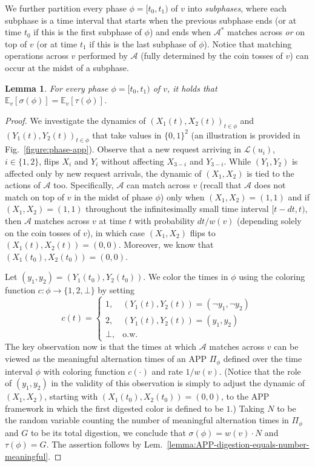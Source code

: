 \documentclass[11pt]{article}
\def\LongVersion{}
\def\LongVersionEnd{}
\newtheorem{lemma}[theorem]{Lemma}
\theoremstyle{definition}
\theoremstyle{plain}
\newtheorem{lemma}[theorem]{Lemma}
\theoremstyle{definition}
\theoremstyle{plain}
\newtheorem{lemma}{Lemma}[section]
\theoremstyle{definition}
\theoremstyle{plain}
\newcommand{\Lem}{Lem.}
\newcommand{\Fig}{Fig.}
\newcommand{\Expect}{\mathbb{E}}
\newcommand{\Leaves}{\mathcal{L}}
\newcommand{\A}{\mathcal{A}}
\newcommand{\adv}[1]{{#1}^{*}}
\begin{document}
We further partition every phase
$\phi = [t_{0}, t_{1})$
of $v$ into \emph{subphases}, where each subphase is
a time interval that starts when the previous subphase ends (or at time
$t_{0}$ if this is the first subphase of $\phi$) and ends when
$\adv{\A}$ matches across \emph{or} on top of $v$ (or at time $t_{1}$ if this
is the last subphase of $\phi$).
Notice that matching operations across $v$ performed by $\A$ (fully
determined by the coin tosses of $v$) can occur at the midst of a subphase.

\begin{lemma} \label{lemma:phase-app}
For every phase
$\phi = [t_{0}, t_{1})$
of $v$, it holds that
$\Expect_{v}[\sigma(\phi)]
=
\Expect_{v}[\tau(\phi)]$.
\end{lemma}
%
\LongVersion %
\begin{proof}
We investigate the dynamics of
$(X_{1}(t), X_{2}(t))_{t \in \phi}$
and
$(Y_{1}(t), Y_{2}(t))_{t \in \phi}$
that take values in
$\{ 0, 1 \}^{2}$
(an illustration is provided in \Fig{}~\ref{figure:phase-app}).
Observe that a new request arriving in $\Leaves(u_{i})$, $i \in \{ 1, 2 \}$,
flips $X_{i}$ and $Y_{i}$ without affecting $X_{3 - i}$ and $Y_{3 - i}$.
While $(Y_{1}, Y_{2})$ is affected only by new request arrivals, the dynamic
of $(X_{1}, X_{2})$ is tied to the actions of $\A$ too.
Specifically, $\A$ can match across $v$ (recall that $\A$ does not match on
top of $v$ in the midst of phase $\phi$) only when
$(X_{1}, X_{2}) = (1, 1)$
and if
$(X_{1}, X_{2}) = (1, 1)$
throughout the infinitesimally small time interval $[t - d t, t)$,
then $\A$ matches across $v$ at time $t$ with probability
$d t / w(v)$
(depending solely on the coin tosses of $v$),
in which case
$(X_{1}, X_{2})$
flips to
$(X_{1}(t), X_{2}(t)) = (0, 0)$.
Moreover, we know that
$(X_{1}(t_{0}), X_{2}(t_{0})) = (0, 0)$.

Let
$(y_{1}, y_{2}) = (Y_{1}(t_{0}), Y_{2}(t_{0}))$.
We color the times in $\phi$ using the coloring function
$c : \phi \rightarrow \{ 1, 2, \bot \}$
by setting
\[
c(t)
=
\left\{
\begin{array}{ll}
1, & (Y_{1}(t), Y_{2}(t)) = (\neg y_{1}, \neg y_{2}) \\
2, & (Y_{1}(t), Y_{2}(t)) = (y_{1}, y_{2}) \\
\bot, & \text{o.w.}
\end{array}
\right.
\]
The key observation now is that the times at which $\A$ matches across $v$
can be viewed as the meaningful alternation times of an APP $\Pi_{\phi}$
defined over the time interval $\phi$ with coloring function $c(\cdot)$ and
rate $1 / w(v)$.
(Notice that the role of $(y_{1}, y_{2})$ in the validity of this observation
is simply to adjust the dynamic of $(X_{1}, X_{2})$, starting with
$(X_{1}(t_{0}), X_{2}(t_{0})) = (0, 0)$,
to the APP framework in which the first digested color is defined to be $1$.)
Taking $N$ to be the random variable counting the number of meaningful
alternation times in $\Pi_{\phi}$ and $G$ to be its total digestion, we
conclude that
$\sigma(\phi)
=
w(v) \cdot N$
and
$\tau(\phi)
=
G$.
The assertion follows by
\Lem{}~\ref{lemma:APP-digestion-equals-number-meaningful}.
\end{proof}
\LongVersionEnd %
\end{document}

